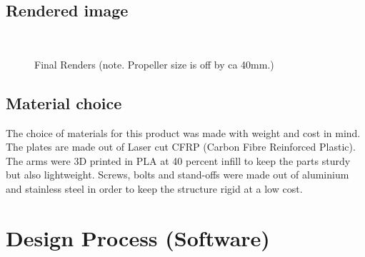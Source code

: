 \documentclass{hitec}
\begin{document}
\pagebreak
	
	\subsection{Rendered image}
\begin{figure}[h]
	\centering
	 \\
	\caption{Final Renders (note. Propeller size is off by ca 40mm.)} \label{fig:fr}
\end{figure}
\pagebreak
	\subsection{Material choice}
	The choice of materials for this product was made with weight and cost in mind. The plates are made out of Laser cut CFRP (Carbon Fibre Reinforced Plastic). The arms were 3D printed in PLA at 40 percent infill to keep the parts sturdy but also lightweight. Screws, bolts and stand-offs were made out of aluminium and stainless steel in order to keep the structure rigid at a low cost.\pagebreak
	\section{Design Process (Software)}
\end{document}
